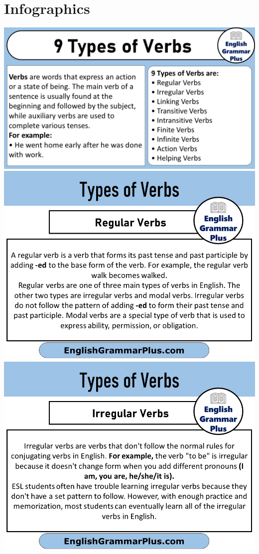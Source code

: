 \chapter{Infographics}
\graphicspath{{D:/Projects/English-Project/project-folders/Verb}}
\includegraphics[scale=0.25]{overview.png}
\includegraphics[scale=0.25]{regularVerbs.png}
\includegraphics[scale=0.25]{irregularVerbs.png}
